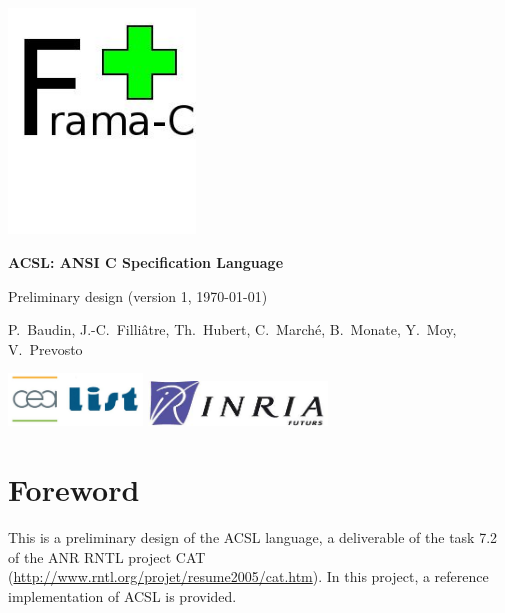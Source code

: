 \documentclass[a4paper,11pt,twoside,openright]{report}
\begin{document}
\sloppy

\begin{titlepage}
\begin{center}
~\vfill

\includegraphics[height=60mm]{FramaC.jpg}

\vspace{20mm}

{\Huge\bfseries ACSL: ANSI C Specification Language}

\bigskip

{\LARGE Preliminary design (version 1, \today)}

\vspace{20mm}

{P.~Baudin, J.-C.~Filli\^atre, Th.~Hubert,
  C.~March\'e, B.~Monate, Y.~Moy, V.~Prevosto}

\vspace{20mm}

\vfill

\includegraphics[height=14mm]{cealistlogo.jpg}
\hfill
\includegraphics[height=12mm]{inriafuturslogoshort.jpg}

\end{center}
\end{titlepage}

\clearpage
\label{chap:contents}
\tableofcontents

\chapter*{Foreword}

This is a preliminary design of the ACSL language, a deliverable of
the task 7.2 of the ANR RNTL project CAT
(\url{http://www.rntl.org/projet/resume2005/cat.htm}). In this
project, a reference implementation of ACSL is provided.
\end{document}
